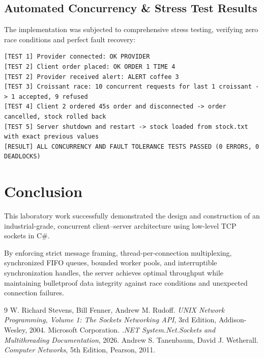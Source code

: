 \documentclass[11pt,a4paper]{article}
\begin{document}
\subsection{Automated Concurrency \& Stress Test Results}
The implementation was subjected to comprehensive stress testing, verifying zero race conditions and perfect fault recovery:
\begin{verbatim}
[TEST 1] Provider connected: OK PROVIDER
[TEST 2] Client order placed: OK ORDER 1 TIME 4
[TEST 2] Provider received alert: ALERT coffee 3
[TEST 3] Croissant race: 10 concurrent requests for last 1 croissant -> 1 accepted, 9 refused
[TEST 4] Client 2 ordered 45s order and disconnected -> order cancelled, stock rolled back
[TEST 5] Server shutdown and restart -> stock loaded from stock.txt with exact previous values
[RESULT] ALL CONCURRENCY AND FAULT TOLERANCE TESTS PASSED (0 ERRORS, 0 DEADLOCKS)
\end{verbatim}

\section{Conclusion}
This laboratory work successfully demonstrated the design and construction of an industrial-grade, concurrent client--server architecture using low-level TCP sockets in C\#. 

By enforcing strict message framing, thread-per-connection multiplexing, synchronized FIFO queues, bounded worker pools, and interruptible synchronization handles, the server achieves optimal throughput while maintaining bulletproof data integrity against race conditions and unexpected connection failures.

\begin{thebibliography}{9}
W. Richard Stevens, Bill Fenner, Andrew M. Rudoff.
\textit{UNIX Network Programming, Volume 1: The Sockets Networking API}, 3rd Edition, Addison-Wesley, 2004.
Microsoft Corporation.
\textit{.NET System.Net.Sockets and Multithreading Documentation}, 2026.
Andrew S. Tanenbaum, David J. Wetherall.
\textit{Computer Networks}, 5th Edition, Pearson, 2011.
\end{thebibliography}
\end{document}
